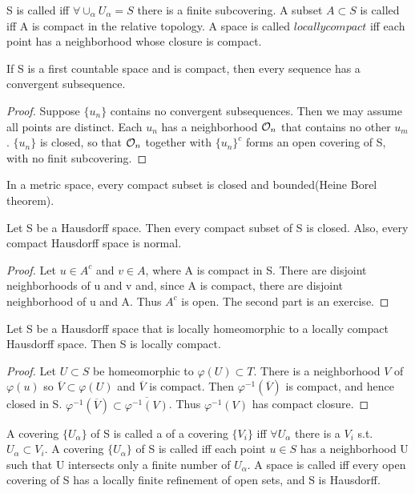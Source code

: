 \begin{definition}
S is called  iff $\forall \cup_\alpha U_\alpha = S$ there is a finite subcovering. A subset $A\subset S$ is called 
iff A is compact in the relative topology. A space is called $locally compact$ iff each point has a neighborhood whose closure is compact.
\end{definition}
\begin{thm}
If S is a first countable space and is compact, then every sequence has a convergent subsequence.
\end{thm}
\begin{proof}
Suppose $\{u_n\}$ contains no convergent subsequences. Then we may assume all points are distinct. Each $u_n$ has a neighborhood $\mathcal{O}_n$
that contains no other $u_m$. $\{u_n\}$ is closed, so that $\mathcal{O}_n$ together with $\{u_n\}^c$ forms an open covering of S, with no finit subcovering.
\end{proof}
In a metric space, every compact subset is closed and bounded(Heine Borel theorem).
\begin{prop}
Let S be a Hausdorff space. Then every compact subset of S is closed. Also, every compact Hausdorff space is normal.
\end{prop}
\begin{proof}
Let $u\in A^c$ and $v\in A$, where A is compact in S. There are disjoint neighborhoods of u and v and, since A is compact, there are disjoint 
neighborhood of u and A. Thus $A^c$ is open. The second part is an exercise.
\end{proof}
\begin{prop}
Let S be a Hausdorff space that is locally homeomorphic to a locally compact Hausdorff space. Then S is locally compact.
\end{prop}
\begin{proof}
Let $U\subset S$ be homeomorphic to $\varphi(U)\subset T$. There is a neighborhood $V$ of $\varphi(u)$ so $\overline{V}\subset \varphi(U)$ and
$\overline{V}$ is compact. Then $\varphi^{-1}(\overline{V})$ is compact, and hence closed in S. $\varphi^{-1}(\overline{V})\subset 
\overline{\varphi^{-1}(V)}$. Thus $\varphi^{-1}(V)$ has compact closure.
\end{proof}
\begin{definition}
A covering $\{U_\alpha\}$ of S is called a  of a covering $\{V_i\}$ iff $\forall U_\alpha$ there is a $V_i$ s.t. $U_\alpha\subset
V_i$. A covering $\{U_\alpha\}$ of S is called  iff each point $u\in S$ has a neighborhood U such that U intersects only a finite
number of $U_\alpha$. A space is called  iff every open covering of S has a locally finite refinement of open sets, and S is
Hausdorff.
\end{definition}
